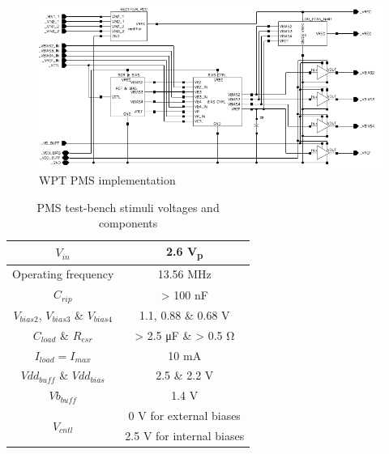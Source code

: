 \documentclass[12pt,a4paper,UKenglish]{report}
\begin{document}
\begin{figure} [H]
  \centering
  \includegraphics[width=\textwidth]{img/wpt_top.pdf} 
 \caption{WPT PMS implementation} 
\label{fig:wpt_top} 
\end{figure}

\begin{table}[!htb]
\caption{PMS test-bench stimuli voltages and components} 
\begin{center}
\begin{tabular}{c|c}
\hline \hline
$V_{in} $			& 2.6 \si{\volt}\textsubscript{p} \\ \hline
Operating frequency	& 13.56 \si{\mega\hertz}	\\ \hline
$C_{rip}$ 		  	& > 100 \si{\nano\farad}	\\ \hline
$V_{bias2}$, $V_{bias3}$ \& $V_{bias4}$ & 1.1, 0.88 \& 0.68 \si{\volt} \\ \hline
$C_{load}$ \& $R_{esr}$ & > 2.5 \si{\micro\farad} \& > 0.5 \si{\ohm} \\ \hline
$I_{load} = I_{max}$ & 10 \si{\milli\ampere} \\ \hline
$Vdd_{buff}$ \& $Vdd_{bias}$ & 2.5 \& 2.2 \si{\volt} \\ \hline
$Vb_{buff}$ & 1.4 V \\ \hline
\multirow{2}{*}{$V_{cntl}$} 
			& 0 \si{\volt} for external biases \\ \cline{2-2}
			& 2.5 \si{\volt} for internal biases  \\ 
\hline \hline
\end{tabular}
\end{center}
\label{tab:pms_stimuli}
\end{table}%
\end{document}
